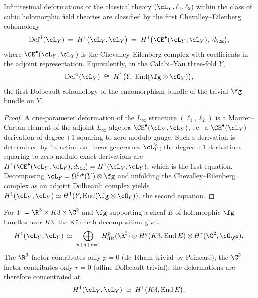 \begin{theorem}
\label{thm:6dhcs-h1}
Infinitesimal deformations of the classical theory
$(\cL_Y,\ell_1,\ell_2)$ within the class of cubic holomorphic field
theories are classified by the first Chevalley--Eilenberg cohomology
\begin{equation}\label{eq:6dhcs-def-h1}
 \mathrm{Def}^1(\cL_Y) \;=\; H^1\bigl(\cL_Y,\cL_Y\bigr)
 \;=\; H^1\bigl(\CE^\bullet(\cL_Y,\cL_Y),\;d_{\CE}\bigr),
\end{equation}
where $\CE^\bullet(\cL_Y,\cL_Y)$ is the Chevalley--Eilenberg complex
with coefficients in the adjoint representation. Equivalently, on the
Calabi--Yau three-fold $Y$,
\begin{equation}\label{eq:6dhcs-def-dolbeault}
 \mathrm{Def}^1(\cL_Y)
 \;\cong\;
 H^1\bigl(Y,\;\mathrm{End}(\fg\otimes\cO_Y)\bigr),
\end{equation}
the first Dolbeault cohomology of the endomorphism bundle of the
trivial $\fg$-bundle on $Y$.
\end{theorem}

\begin{proof}
A one-parameter deformation of the $L_\infty$ structure
$(\ell_1,\ell_2)$ is a Maurer--Cartan element of the adjoint
$L_\infty$-algebra $\CE^\bullet(\cL_Y,\cL_Y)$, i.e.\ a
$\CE^\bullet(\cL_Y)$-derivation of degree $+1$ squaring to zero modulo
gauge. Such a derivation is determined by its action on linear
generators $\cL_Y^\vee$; the degree-$+1$ derivations squaring to
zero modulo exact derivations are
$H^1(\CE^\bullet(\cL_Y,\cL_Y),d_{\CE}) = H^1(\cL_Y,\cL_Y)$, which is
the first equation. Decomposing $\cL_Y = \Omega^{0,\bullet}(Y)\otimes
\fg$ and unfolding the Chevalley--Eilenberg complex as an adjoint
Dolbeault complex yields
$H^1(\cL_Y,\cL_Y) \simeq H^1(Y,\mathrm{End}(\fg\otimes\cO_Y))$,
the second equation.
\end{proof}

\begin{corollary}[Deformations for $Y = \R^3\times K3\times\C^2$;
 \ClaimStatusProvedHere]
\label{cor:6dhcs-def-r3-k3-c2}
For $Y = \R^3\times K3\times\C^2$ and $\fg$ supporting a sheaf $E$ of
holomorphic $\fg$-bundles over $K3$, the Künneth decomposition gives
\begin{equation}\label{eq:6dhcs-def-k3-kunneth}
 H^1(\cL_Y,\cL_Y)
 \;\simeq\;
 \bigoplus_{p+q+r = 1}
 H^p_{\mathrm{dR}}(\R^3)
 \otimes H^q(K3,\mathrm{End}\,E)
 \otimes H^r(\C^2,\cO_{\C^2}).
\end{equation}
The $\R^3$ factor contributes only $p = 0$ (de~Rham-trivial by
Poincar\'{e}); the $\C^2$ factor contributes only $r = 0$ (affine
Dolbeault-trivial); the deformations are therefore concentrated at
\begin{equation}\label{eq:6dhcs-def-k3-endE}
 H^1(\cL_Y,\cL_Y) \;\simeq\; H^1\bigl(K3,\mathrm{End}\,E\bigr).
\end{equation}
\end{corollary}

